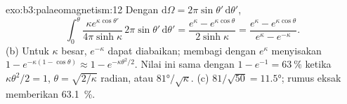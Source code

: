 \begin{solution}{exo:b3:palaeomagnetism:12}
Dengan $\mathrm d\Omega = 2\pi\sin\theta'\,\mathrm d\theta'$,
\[
  \int_0^\theta\frac{\kappa e^{\kappa\cos\theta'}}{4\pi\sinh\kappa}\,2\pi\sin\theta'\,
  \mathrm d\theta' = \frac{e^\kappa - e^{\kappa\cos\theta}}{2\sinh\kappa}
  = \frac{e^\kappa - e^{\kappa\cos\theta}}{e^\kappa - e^{-\kappa}} .
\]
(b) Untuk $\kappa$ besar, $e^{-\kappa}$ dapat diabaikan; membagi dengan $e^\kappa$
menyisakan $1 - e^{-\kappa(1 - \cos\theta)} \approx 1 - e^{-\kappa\theta^2/2}$. Nilai ini
sama dengan $1 - e^{-1} = \qty{63}{\percent}$ ketika $\kappa\theta^2/2 = 1$, $\theta =
\sqrt{2/\kappa}$ radian, atau $\ang{81}/\sqrt\kappa$. (c) $81/\sqrt{50} =
\ang{11.5}$; rumus eksak memberikan \qty{63.1}{\percent}.
\end{solution}

